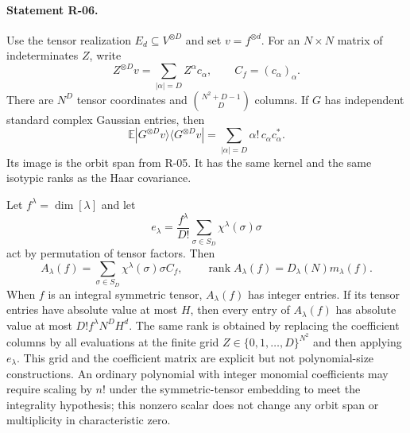 \paragraph{Statement R-06.}
Use the tensor realization $E_d\subseteq V^{\otimes D}$ and set
$v=f^{\otimes d}$. For an $N\times N$ matrix of indeterminates $Z$, write
\begin{equation}\label{R06:coefficients}
 Z^{\otimes D}v=\sum_{|\alpha|=D}Z^\alpha c_\alpha,
 \qquad C_f=(c_\alpha)_\alpha.
\end{equation}
There are $N^D$ tensor coordinates and
$\binom{N^2+D-1}{D}$ columns. If $G$ has independent standard complex
Gaussian entries, then
\begin{equation}\label{R06:gaussian}
 \mathbb E|G^{\otimes D}v\rangle\langle G^{\otimes D}v|
   =\sum_{|\alpha|=D}\alpha!\,c_\alpha c_\alpha^*.
\end{equation}
Its image is the orbit span from R-05. It has the same kernel and
the same isotypic ranks as the Haar covariance.

Let $f^\lambda=\dim[\lambda]$ and let
\[
 e_\lambda=\frac{f^\lambda}{D!}
       \sum_{\sigma\in S_D}\chi^\lambda(\sigma)\sigma
\]
act by permutation of tensor factors. Then
\begin{equation}\label{R06:integer}
 A_\lambda(f)=\sum_{\sigma\in S_D}\chi^\lambda(\sigma)\sigma C_f,
 \qquad
 \operatorname{rank}A_\lambda(f)=D_\lambda(N)m_\lambda(f).
\end{equation}
When $f$ is an integral symmetric tensor, $A_\lambda(f)$ has integer
entries. If its tensor entries have absolute value at most $H$, then
every entry of $A_\lambda(f)$ has absolute value at most
$D!f^\lambda N^D H^d$.
The same rank is obtained by replacing the coefficient columns by all
evaluations at the finite grid $Z\in\{0,1,\ldots,D\}^{N^2}$ and then
applying $e_\lambda$. This grid and the coefficient matrix are
explicit but not polynomial-size constructions.
An ordinary polynomial with integer monomial coefficients may require
scaling by $n!$ under the symmetric-tensor embedding to meet the
integrality hypothesis; this nonzero scalar does not change any orbit
span or multiplicity in characteristic zero.

